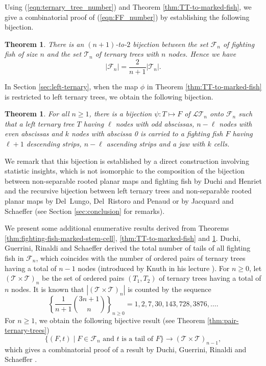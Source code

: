 \documentclass[a4paper,11pt,reqno]{amsart}
\newtheorem{thm}[lem]{Theorem}
\theoremstyle{definition}
\numberwithin{equation}{section}
\newcommand{\LT}{{\mathcal{LT}}}
\newcommand{\F}{{\mathcal{F}}}
\newcommand{\T}{{\mathcal{T}}}
\begin{document}
Using (\ref{eqn:ternary_tree_number}) and Theorem \ref{thm:TT-to-marked-fish}, we give a combinatorial proof of (\ref{eqn:FF_number}) by establishing the following bijection.

\begin{thm} \label{thm:2-to-(n+1)}
There is an $(n+1)$-to-$2$ bijection between the set $\F_n$ of fighting fish of size $n$ and the set $\T_n$ of ternary trees with $n$ nodes. Hence we have
\begin{equation} \label{eqn:fish-number}
|\F_n|=\frac{2}{n+1}|\T_n|.
\end{equation}
\end{thm}


In Section \ref{sec:left-ternary}, when the map $\phi$ in Theorem \ref{thm:TT-to-marked-fish} is restricted to left ternary trees, we obtain the following bijection.

\begin{thm} \label{thm:LTT-to-fish-bijection}
For all $n\ge 1$, there is a bijection $\psi: T\mapsto F$ of $\LT_n$ onto $\F_n$ such that a left ternary tree $T$ having $\ell$ nodes with odd abscissas, $n-\ell$ nodes with even abscissas and $k$ nodes with abscissa 0 is carried to a fighting fish $F$ having $\ell+1$ descending strips, $n-\ell$ ascending strips and a jaw with $k$ cells.
\end{thm}


We remark that this bijection is established by a direct construction involving statistic insights, which is not isomorphic to the composition of the bijection between non-separable rooted planar maps and fighting fish by Duchi and Henriet \cite{DH-2022-A} and the recursive bijection between left ternary trees and non-separable rooted planar maps by Del~Lungo, Del~Ristoro and Penaud \cite{DLDRP} or by Jacquard and Schaeffer \cite{JS-1998} (see Section \ref{sec:conclusion} for remarks).


\medskip
We present some additional enumerative results derived from Theorems \ref{thm:fighting-fish-marked-stem-cell}, \ref{thm:TT-to-marked-fish} and \ref{thm:LTT-to-fish-bijection}. 
Duchi, Guerrini, Rinaldi and Schaeffer \cite{DGRS-A} derived the total number of tails of all fighting fish in $\F_n$, which coincides with the number of ordered pairs of ternary trees having a total of $n-1$ nodes (introduced by Knuth in his lecture \cite{Knuth-2014}). For $n\ge 0$, let $(\T\times\T)_n$ be the set of ordered pairs $(T_1,T_2)$ of ternary trees having a total of $n$ nodes. It is known that $|(\T\times\T)_n|$ is counted by the sequence \cite[A006013]{oeis}
\begin{equation} \label{eqn:ordered-pair-TT}
\left\{\frac{1}{n+1}\binom{3n+1}{n}\right\}_{n\ge 0} = 1, 2, 7, 30, 143, 728, 3876,\dots.
\end{equation}
For $n\ge 1$, we obtain the following bijective result  (see Theorem \ref{thm:pair-ternary-trees})
\begin{equation}
\{(F,t)\mid F\in\F_n\mbox{ and $t$ is a tail of $F$}\}  \rightarrow (\T\times\T)_{n-1}, \label{eqn:fish-tail-ordered-pair}
\end{equation}
which gives a combinatorial proof of a result by Duchi, Guerrini, Rinaldi and Schaeffer \cite[Corollary 1]{DGRS-A}. 
\end{document}
